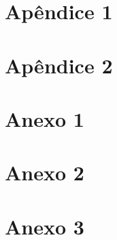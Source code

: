 %



\begin{apendicesenv}
\partapendices
\chapter{Apêndice 1}
\lipsum[50]
\chapter{Apêndice 2}
\lipsum[55-57]
\end{apendicesenv}


\begin{anexosenv}
\partanexos
\chapter{Anexo 1}
\lipsum[30]
\chapter{Anexo 2}
\lipsum[31]
\chapter{Anexo 3}
\lipsum[32]
\end{anexosenv}


\printindex

